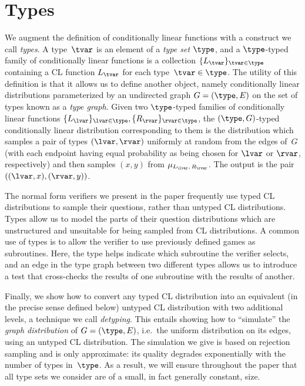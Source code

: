 \section{Types}
\label{sec:types}

We augment the definition of conditionally linear functions with a construct
we call \emph{types}.
A type~$\tvar$ is an element of a \emph{type set} $\type$, and a $\type$-typed
family of conditionally linear functions is a collection
$\{L_\tvar\}_{\tvar\in\type}$ containing a CL function $L_\tvar$ for each
type~$\tvar\in\type$.
The utility of this definition is that it allows us to define another object,
namely conditionally linear distributions parameterized by an undirected graph
$G = (\type, E)$ on the set of types known as a \emph{type graph}.
Given two $\type$-typed families of conditionally linear functions
$\{L_\lvar\}_{\lvar\in\type}, \{R_\rvar\}_{\rvar\in\type}$, the $(\type,
G)$-typed conditionally linear distribution corresponding to them is the
distribution which samples a pair of types $(\lvar, \rvar)$ uniformly at random
from the edges of~$G$ (with each endpoint having equal probability as being
chosen for $\lvar$ or $\rvar$, respectively) and then samples $(x, y)$ from
$\mu_{L_\lvar,\, R_\rvar}$.
The output is the pair $( (\lvar, x), (\rvar, y) )$.

The normal form verifiers we present in the paper frequently use typed CL
distributions to sample their questions, rather than untyped CL distributions.
Types allow us to model the parts of their question distributions which are
unstructured and unsuitable for being sampled from CL distributions.
A common use of types is to allow the verifier to use previously defined games
as subroutines.
Here, the type helps indicate which subroutine the verifier selects, and an edge
in the type graph between two different types allows us to introduce a test that
cross-checks the results of one subroutine with the results of another.

Finally, we show how to convert any typed CL distribution into an equivalent (in
the precise sense defined below) untyped CL distribution with two additional
levels, a technique we call \emph{detyping}.
This entails showing how to ``simulate'' the \emph{graph distribution} of $G =
(\type, E)$, i.e.\ the uniform distribution on its edges, using an untyped CL
distribution.
The simulation we give is based on rejection sampling and is only approximate:
its quality degrades exponentially with the number of types in~$\type$.
As a result, we will ensure throughout the paper that all type sets we consider
are of a small, in fact generally constant, size.

